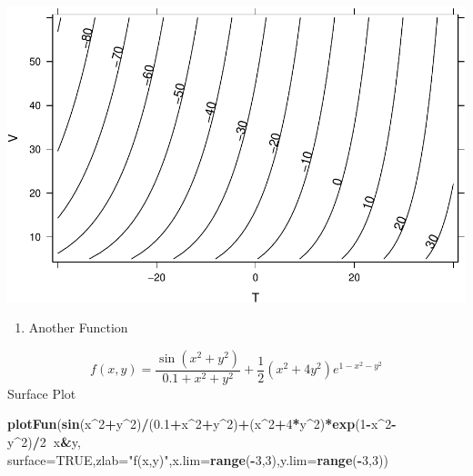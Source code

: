 \documentclass[
]{book}
\newenvironment{Shaded}{\begin{snugshade}}{\end{snugshade}}
\newcommand{\DataTypeTok}[1]{\textcolor[rgb]{0.13,0.29,0.53}{#1}}
\newcommand{\DecValTok}[1]{\textcolor[rgb]{0.00,0.00,0.81}{#1}}
\newcommand{\FloatTok}[1]{\textcolor[rgb]{0.00,0.00,0.81}{#1}}
\newcommand{\KeywordTok}[1]{\textcolor[rgb]{0.13,0.29,0.53}{\textbf{#1}}}
\newcommand{\NormalTok}[1]{#1}
\newcommand{\OperatorTok}[1]{\textcolor[rgb]{0.81,0.36,0.00}{\textbf{#1}}}
\newcommand{\OtherTok}[1]{\textcolor[rgb]{0.56,0.35,0.01}{#1}}
\newcommand{\StringTok}[1]{\textcolor[rgb]{0.31,0.60,0.02}{#1}}
\providecommand{\tightlist}{%
  \setlength{\itemsep}{0pt}\setlength{\parskip}{0pt}}
\begin{document}
\includegraphics{_bookdown_files/math135_handbook_files/figure-latex/unnamed-chunk-72-1.pdf}

\begin{enumerate}
\def\labelenumi{\arabic{enumi}.}
\setcounter{enumi}{1}
\tightlist
\item
  Another Function
\end{enumerate}

\[
f(x,y) = \frac{\sin(x^2+y^2)}{0.1+x^2+y^2}+ \frac{1}{2}(x^2+4y^2)e^{1-x^2-y^2}
\]
Surface Plot

\begin{Shaded}
\begin{Highlighting}[]
\KeywordTok{plotFun}\NormalTok{(}\KeywordTok{sin}\NormalTok{(x}\OperatorTok{^}\DecValTok{2}\OperatorTok{+}\NormalTok{y}\OperatorTok{^}\DecValTok{2}\NormalTok{)}\OperatorTok{/}\NormalTok{(}\FloatTok{0.1}\OperatorTok{+}\NormalTok{x}\OperatorTok{^}\DecValTok{2}\OperatorTok{+}\NormalTok{y}\OperatorTok{^}\DecValTok{2}\NormalTok{)}\OperatorTok{+}\NormalTok{(x}\OperatorTok{^}\DecValTok{2}\OperatorTok{+}\DecValTok{4}\OperatorTok{*}\NormalTok{y}\OperatorTok{^}\DecValTok{2}\NormalTok{)}\OperatorTok{*}\KeywordTok{exp}\NormalTok{(}\DecValTok{1}\OperatorTok{-}\NormalTok{x}\OperatorTok{^}\DecValTok{2}\OperatorTok{-}\NormalTok{y}\OperatorTok{^}\DecValTok{2}\NormalTok{)}\OperatorTok{/}\DecValTok{2}\OperatorTok{~}\NormalTok{x}\OperatorTok{&}\NormalTok{y,}
\DataTypeTok{surface=}\OtherTok{TRUE}\NormalTok{,}\DataTypeTok{zlab=}\StringTok{"f(x,y)"}\NormalTok{,}\DataTypeTok{x.lim=}\KeywordTok{range}\NormalTok{(}\OperatorTok{-}\DecValTok{3}\NormalTok{,}\DecValTok{3}\NormalTok{),}\DataTypeTok{y.lim=}\KeywordTok{range}\NormalTok{(}\OperatorTok{-}\DecValTok{3}\NormalTok{,}\DecValTok{3}\NormalTok{))}
\end{Highlighting}
\end{Shaded}
\end{document}
